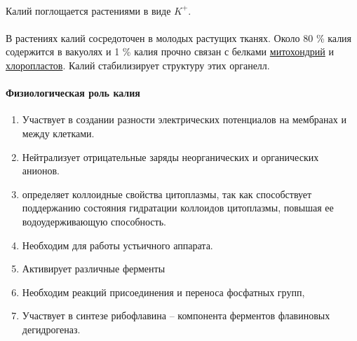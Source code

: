\paragraph*{}Калий поглощается растениями в виде $K^{+}$. 

\paragraph*{}В растениях калий сосредоточен в молодых растущих тканях. Около 80 \% калия содержится в вакуолях и 1 \% калия прочно связан с белками \hyperlink{mitohondria}{митохондрий} и \hyperlink{plastides}{хлоропластов}. Калий стабилизирует структуру этих органелл. 

\paragraph*{Физиологическая роль калия}

\begin{enumerate}

\item Участвует в создании разности электрических потенциалов на мембранах и между клетками.
\item Нейтрализует отрицательные заряды неорганических и органических анионов. \item определяет коллоидные свойства цитоплазмы, так как способствует поддержанию состояния гидратации коллоидов цитоплазмы, повышая ее водоудерживающую способность. 
\item Необходим для работы устьичного аппарата. 
\item Активирует различные ферменты  
\item Необходим реакций присоединения и переноса фосфатных групп, 
\item Участвует в синтезе рибофлавина -- компонента ферментов флавиновых дегидрогеназ. 


\end{enumerate}

